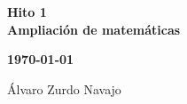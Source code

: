 \begin{center}
\vspace*{3cm} %
{\huge \textbf{Hito 1}}\\
\vspace{0.75cm}
\textbf{Ampliación de matemáticas} \\
\begin{center}
    \large{\textbf{\today}} \\
\end{center}

\vspace{5cm} %

\begin{center}
        \large{Álvaro Zurdo Navajo}
\end{center}

\end{center}